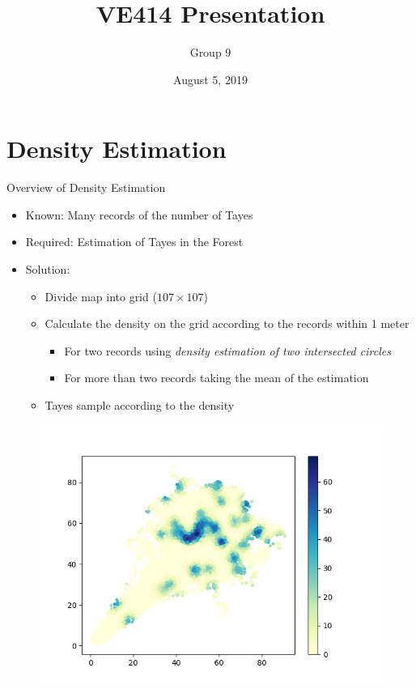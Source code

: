 \documentclass{beamer}
\title{VE414 Presentation}
\author{Group 9}
\date{August 5, 2019}
\begin{document}
\maketitle


\section{Density Estimation}

\begin{frame}{Overview of Density Estimation}
    \begin{itemize}
        \item Known: Many records of the number of Tayes
        \item Required: Estimation of Tayes in the Forest
        \item Solution: \begin{itemize}
            \item Divide map into grid ($107\times 107$)
            \item Calculate the density on the grid according to the records within 1 meter
            \begin{itemize}
                \item For two records using \textit{density estimation of two intersected circles}
                \item For more than two records taking the mean of the estimation
            \end{itemize}
            \item Tayes sample according to the density
        \end{itemize}
    \end{itemize}
    \begin{figure}[H]
        \centering
        \includegraphics[scale=0.25]{ag.png}

\end{figure}
\end{frame}
\end{document}
